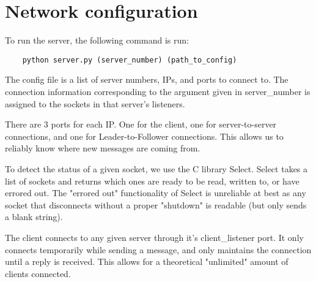 \documentclass[12pt]{scrartcl}
\begin{document}
	\section*{Network configuration}

	To run the server, the following command is run:
	\begin{lstlisting}
	python server.py (server_number) (path_to_config)
	\end{lstlisting}

	The config file is a list of server numbers, IPs, and ports to connect to. The connection information corresponding to the argument given in server\_number is assigned to the sockets in that server's listeners.

	There are 3 ports for each IP. One for the client, one for server-to-server connections, and one for Leader-to-Follower connections. This allows us to reliably know where new messages are coming from.

	To detect the status of a given socket, we use the C library Select. Select takes a list of sockets and returns which ones are ready to be read, written to, or have errored out. The "errored out" functionality of Select is unreliable at best as any socket that disconnects without a proper "shutdown" is readable (but only sends a blank string).

	The client connects to any given server through it's client\_listener port. It only connects temporarily while sending a message, and only maintains the connection until a reply is received. This allows for a theoretical "unlimited" amount of clients connected.



\end{document}
